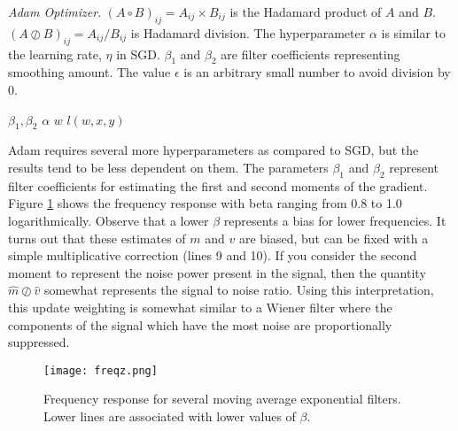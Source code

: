 \begin{algorithm}
\begin{algorithmic}[1]
\begin{spacing}{1.0}
    \caption{\textit{Adam Optimizer}.  $(A\circ B)_{ij} = A_{ij}\times B_{ij}$ is the Hadamard product of $A$ and $B$.  $(A \oslash B)_{ij} = A_{ij}/B_{ij}$ is Hadamard division.  The hyperparameter $\alpha$ is similar to the learning rate, $\eta$ in SGD.  $\beta_1$ and $\beta_2$ are filter coefficients representing smoothing amount.  The value $\epsilon$ is an arbitrary small number to avoid division by $0$.}
    \Require $\beta_1,\beta_2$
    \Require $\alpha$
    \Require $w$
    \Require $l(w,x,y)$
    \EndWhile
\label{alg:adam}
\end{spacing}
\end{algorithmic}
\end{algorithm}

Adam requires several more hyperparameters as compared to SGD, but the results tend to be less dependent on them.  The parameters $\beta_1$ and $\beta_2$ represent filter coefficients for estimating the first and second moments of the gradient.  Figure \ref{fig:freqz} shows the frequency response with beta ranging from 0.8 to 1.0 logarithmically. Observe that a lower $\beta$ represents a bias for lower frequencies.  It turns out that these estimates of $m$ and $v$ are biased, but can be fixed with a simple multiplicative correction (lines 9 and 10).  If you consider the second moment to represent the noise power present in the signal, then the quantity $\hat{m}\oslash \hat{v}$ somewhat represents the signal to noise ratio.  Using this interpretation, this update weighting is somewhat similar to a Wiener filter where the components of the signal which have the most noise are proportionally suppressed.

\begin{figure}
    \centering
    \texttt{[image: freqz.png]}
    \caption{Frequency response for several moving average exponential filters.  Lower lines are associated with lower values of $\beta$.}
    \label{fig:freqz}
\end{figure}


